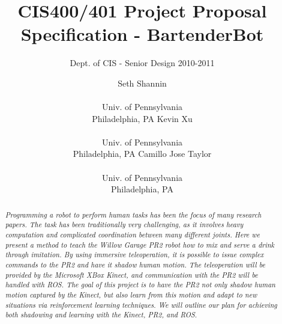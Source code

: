 \documentclass{sig-alternate}
\begin{document}
 

\title{CIS400/401 Project Proposal Specification - BartenderBot}
\subtitle{Dept. of CIS - Senior Design 2010-2011}
\author{
\alignauthor Seth Shannin \\  \\ Univ. of Pennsylvania \\ Philadelphia, PA
\alignauthor Kevin Xu \\  \\ Univ. of Pennsylvania \\ Philadelphia, PA
\alignauthor Camillo Jose Taylor \\  \\ Univ. of Pennsylvania \\ Philadelphia, PA}
\date{}
\maketitle

\begin{abstract}
\textit{Programming a robot to perform human tasks has been the focus of many research papers. The task has been traditionally very challenging, as it involves heavy computation and complicated coordination between many different joints. Here we present a method to teach the Willow Garage PR2 robot how to mix and serve a drink through imitation. By using immersive teleoperation, it is possible to issue complex commands to the PR2 and have it shadow human motion. The teleoperation will be provided by the Microsoft XBox Kinect, and communication with the PR2 will be handled with ROS. The goal of this project is to have the PR2 not only shadow human motion captured by the Kinect, but also learn from this motion and adapt to new situations via reinforcement learning techniques. We will outline our plan for achieving both shadowing and learning with the Kinect, PR2, and ROS.}
\end{abstract}

\end{document}
